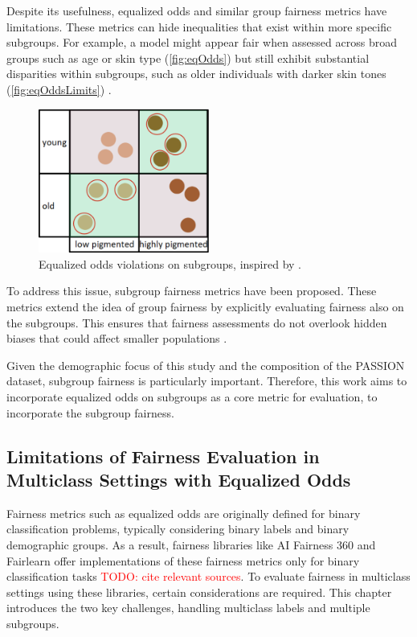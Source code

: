 \documentclass[12pt, a4paper, oneside]{book}   	%
\renewcommand{\todo}[1]{\textcolor{red}{TODO: #1}}
\begin{document}
		Despite its usefulness, equalized odds and similar group fairness metrics have limitations. These metrics can hide inequalities that exist within more specific subgroups. For example, a model might appear fair when assessed across broad groups such as age or skin type (\autoref{fig:eqOdds}) but still exhibit substantial disparities within subgroups, such as older individuals with darker skin tones (\autoref{fig:eqOddsLimits}) \autocites{M79_Kearns_2018}{M80_Kearns_2019}.
		
		\begin{figure}[H]
			\centering
			\includegraphics[width=0.5\textwidth]{figures/EqualizedOddsSubgroupsIssueIllustration.png}
			\caption{Equalized odds violations on subgroups, inspired by \autocite{M80_Kearns_2019}.}
			\label{fig:eqOddsLimits}
		\end{figure}
		
		To address this issue, subgroup fairness metrics have been proposed. These metrics extend the idea of group fairness by explicitly evaluating fairness also on the subgroups. This ensures that fairness assessments do not overlook hidden biases that could affect smaller populations \autocites{M79_Kearns_2018}{M80_Kearns_2019}.
		
		Given the demographic focus of this study and the composition of the PASSION dataset, subgroup fairness is particularly important. Therefore, this work aims to incorporate equalized odds on subgroups as a core metric for evaluation, to incorporate the subgroup fairness.
		
		
		\subsection{Limitations of Fairness Evaluation in Multiclass Settings with Equalized Odds}
		Fairness metrics such as equalized odds are originally defined for binary classification problems, typically considering binary labels and binary demographic groups. As a result, fairness libraries like AI Fairness 360 and Fairlearn offer implementations of these fairness metrics only for binary classification tasks \todo{cite relevant sources}. To evaluate fairness in multiclass settings using these libraries, certain considerations are required. This chapter introduces the two key challenges, handling multiclass labels and multiple subgroups.		
		
\end{document}
